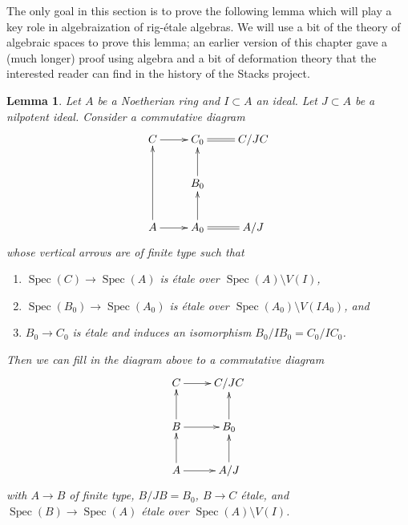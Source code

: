 \documentclass{stacks-project}
\theoremstyle{plain}
\newtheorem{lemma}[subsection]{Lemma}
\theoremstyle{definition}
\theoremstyle{remark}
\numberwithin{equation}{subsection}
\def\Spec{\mathop{\mathrm{Spec}}}
\begin{document}
\noindent
The only goal in this section is to prove the following lemma which
will play a key role in algebraization of rig-\'etale algebras.
We will use a bit of the theory of algebraic spaces to prove this lemma;
an earlier version of this chapter gave a (much longer) proof using algebra
and a bit of deformation theory that the interested reader can find in
the history of the Stacks project.

\begin{lemma}
\label{lemma-lift-approximation}
Let $A$ be a Noetherian ring and $I \subset A$ an ideal.
Let $J \subset A$ be a nilpotent ideal. Consider a commutative diagram
$$
\xymatrix{
C \ar[r] & C_0 \ar@{=}[r] & C/JC \\
& B_0 \ar[u] \\
A \ar[r] \ar[uu] & A_0 \ar[u] \ar@{=}[r] & A/J
}
$$
whose vertical arrows are of finite type such that
\begin{enumerate}
\item $\Spec(C) \to \Spec(A)$ is \'etale over $\Spec(A) \setminus V(I)$,
\item $\Spec(B_0) \to \Spec(A_0)$ is \'etale over
$\Spec(A_0) \setminus V(IA_0)$, and
\item $B_0 \to C_0$ is \'etale and induces an isomorphism
$B_0/IB_0 = C_0/IC_0$.
\end{enumerate}
Then we can fill in the diagram above to a commutative diagram
$$
\xymatrix{
C \ar[r] & C/JC \\
B \ar[u] \ar[r] & B_0 \ar[u] \\
A \ar[r] \ar[u] & A/J \ar[u]
}
$$
with $A \to B$ of finite type, $B/JB = B_0$, $B \to C$ \'etale, and
$\Spec(B) \to \Spec(A)$ \'etale over $\Spec(A) \setminus V(I)$.
\end{lemma}
\end{document}
